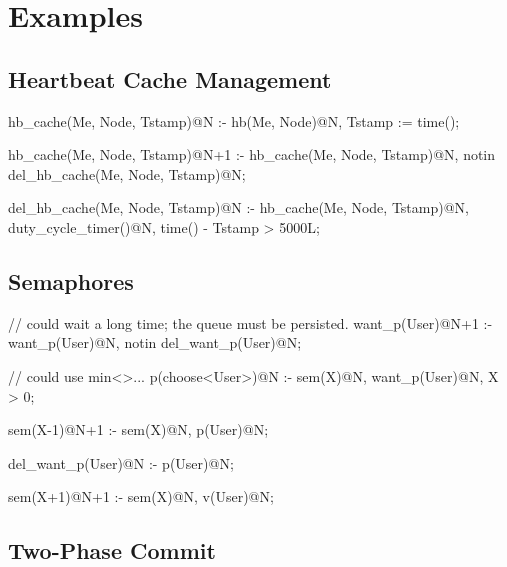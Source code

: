 
\section{Examples}

\subsection{Heartbeat Cache Management}

\begin{Dedalus}
\small
hb_cache(Me, Node, Tstamp)@N :-
    hb(Me, Node)@N,
    Tstamp := time();

hb_cache(Me, Node, Tstamp)@N+1 :-
    hb_cache(Me, Node, Tstamp)@N,
    notin del_hb_cache(Me, Node, Tstamp)@N;

del_hb_cache(Me, Node, Tstamp)@N :-
    hb_cache(Me, Node, Tstamp)@N, 
    duty_cycle_timer()@N,
    time() - Tstamp > 5000L;
\end{Dedalus}

\subsection{Semaphores}

\begin{Dedalus}
\small
// could wait a long time; the queue must 
be persisted.
want_p(User)@N+1 :-
    want_p(User)@N,
    notin del_want_p(User)@N;

// could use min<>...
p(choose<User>)@N :-
    sem(X)@N,
    want_p(User)@N,
    X > 0;

sem(X-1)@N+1 :-
    sem(X)@N,
    p(User)@N;

del_want_p(User)@N :-
    p(User)@N;
 
sem(X+1)@N+1 :-
    sem(X)@N,
    v(User)@N;
\end{Dedalus}

\subsection{Two-Phase Commit}

